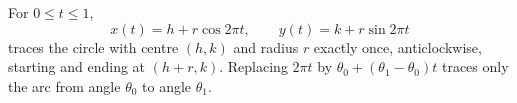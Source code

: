 \begin{theorem}\label{thm:parametric-circle}
  For $0 \leq t \leq 1$,
  \[
    x(t) = h + r \cos 2\pi t, \qquad y(t) = k + r \sin 2\pi t
  \]
  traces the circle with centre $(h, k)$ and radius $r$ exactly once,
  anticlockwise, starting and ending at $(h + r, k)$. Replacing $2\pi t$ by
  $\theta_0 + (\theta_1 - \theta_0)t$ traces only the arc from angle $\theta_0$
  to angle $\theta_1$.
\end{theorem}
